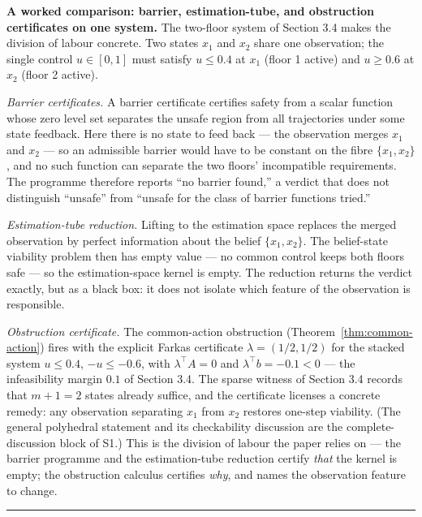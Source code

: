 \documentclass[11pt]{article}
\theoremstyle{definition}
\begin{document}
\textbf{A worked comparison: barrier, estimation-tube, and obstruction certificates on one system.} The two-floor system of Section 3.4 makes the division of labour concrete. Two states \(x_1\) and \(x_2\) share one observation; the single control \(u\in[0,1]\) must satisfy \(u\le 0.4\) at \(x_1\) (floor 1 active) and \(u\ge 0.6\) at \(x_2\) (floor 2 active).

\emph{Barrier certificates.} A barrier certificate certifies safety from a scalar function whose zero level set separates the unsafe region from all trajectories under some state feedback. Here there is no state to feed back --- the observation merges \(x_1\) and \(x_2\) --- so an admissible barrier would have to be constant on the fibre \(\{x_1,x_2\}\), and no such function can separate the two floors' incompatible requirements. The programme therefore reports ``no barrier found,'' a verdict that does not distinguish ``unsafe'' from ``unsafe for the class of barrier functions tried.''

\emph{Estimation-tube reduction.} Lifting to the estimation space replaces the merged observation by perfect information about the belief \(\{x_1,x_2\}\). The belief-state viability problem then has empty value --- no common control keeps both floors safe --- so the estimation-space kernel is empty. The reduction returns the verdict exactly, but as a black box: it does not isolate which feature of the observation is responsible.

\emph{Obstruction certificate.} The common-action obstruction (Theorem~\ref{thm:common-action}) fires with the explicit Farkas certificate \(\lambda=(1/2,1/2)\) for the stacked system \(u\le 0.4\), \(-u\le -0.6\), with \(\lambda^{\top}A=0\) and \(\lambda^{\top}b=-0.1<0\) --- the infeasibility margin \(0.1\) of Section 3.4. The sparse witness of Section 3.4 records that \(m+1=2\) states already suffice, and the certificate licenses a concrete remedy: any observation separating \(x_1\) from \(x_2\) restores one-step viability. (The general polyhedral statement and its checkability discussion are the complete-discussion block of S1.) This is the division of labour the paper relies on --- the barrier programme and the estimation-tube reduction certify \emph{that} the kernel is empty; the obstruction calculus certifies \emph{why}, and names the observation feature to change.


\begin{center}\rule{0.5\linewidth}{0.5pt}\end{center}
\end{document}
